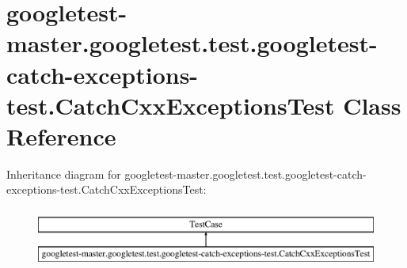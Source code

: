\hypertarget{classgoogletest-master_1_1googletest_1_1test_1_1googletest-catch-exceptions-test_1_1_catch_cxx_exceptions_test}{}\section{googletest-\/master.googletest.\+test.\+googletest-\/catch-\/exceptions-\/test.Catch\+Cxx\+Exceptions\+Test Class Reference}
\label{classgoogletest-master_1_1googletest_1_1test_1_1googletest-catch-exceptions-test_1_1_catch_cxx_exceptions_test}
Inheritance diagram for googletest-\/master.googletest.\+test.\+googletest-\/catch-\/exceptions-\/test.Catch\+Cxx\+Exceptions\+Test\+:\begin{figure}[H]
\begin{center}
\leavevmode
\includegraphics[height=2.000000cm]{d3/d27/classgoogletest-master_1_1googletest_1_1test_1_1googletest-catch-exceptions-test_1_1_catch_cxx_exceptions_test}
\end{center}
\end{figure}
